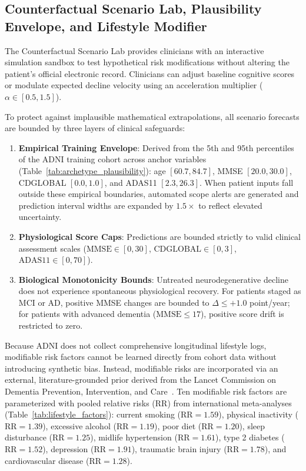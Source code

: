 \subsection{Counterfactual Scenario Lab, Plausibility Envelope, and Lifestyle Modifier}
The Counterfactual Scenario Lab provides clinicians with an interactive simulation sandbox to test hypothetical risk modifications without altering the patient's official electronic record. Clinicians can adjust baseline cognitive scores or modulate expected decline velocity using an acceleration multiplier ($\alpha \in [0.5, 1.5]$).

To protect against implausible mathematical extrapolations, all scenario forecasts are bounded by three layers of clinical safeguards:
\begin{enumerate}
    \item \textbf{Empirical Training Envelope}: Derived from the 5th and 95th percentiles of the ADNI training cohort across anchor variables (Table~\ref{tab:archetype_plausibility}): age $[60.7, 84.7]$, MMSE $[20.0, 30.0]$, CDGLOBAL $[0.0, 1.0]$, and ADAS11 $[2.3, 26.3]$. When patient inputs fall outside these empirical boundaries, automated scope alerts are generated and prediction interval widths are expanded by $1.5\times$ to reflect elevated uncertainty.
    \item \textbf{Physiological Score Caps}: Predictions are bounded strictly to valid clinical assessment scales ($\text{MMSE} \in [0, 30]$, $\text{CDGLOBAL} \in [0, 3]$, $\text{ADAS11} \in [0, 70]$).
    \item \textbf{Biological Monotonicity Bounds}: Untreated neurodegenerative decline does not experience spontaneous physiological recovery. For patients staged as MCI or AD, positive MMSE changes are bounded to $\Delta \le +1.0$ point/year; for patients with advanced dementia ($\text{MMSE} \le 17$), positive score drift is restricted to zero.
\end{enumerate}



Because ADNI does not collect comprehensive longitudinal lifestyle logs, modifiable risk factors cannot be learned directly from cohort data without introducing synthetic bias. Instead, modifiable risks are incorporated via an external, literature-grounded prior derived from the Lancet Commission on Dementia Prevention, Intervention, and Care~\cite{livingston2020lancet,livingston2024lancet}. Ten modifiable risk factors are parameterized with pooled relative risks (RR) from international meta-analyses (Table~\ref{tab:lifestyle_factors}): current smoking ($\text{RR}=1.59$), physical inactivity ($\text{RR}=1.39$), excessive alcohol ($\text{RR}=1.19$), poor diet ($\text{RR}=1.20$), sleep disturbance ($\text{RR}=1.25$), midlife hypertension ($\text{RR}=1.61$), type 2 diabetes ($\text{RR}=1.52$), depression ($\text{RR}=1.91$), traumatic brain injury ($\text{RR}=1.78$), and cardiovascular disease ($\text{RR}=1.28$).

